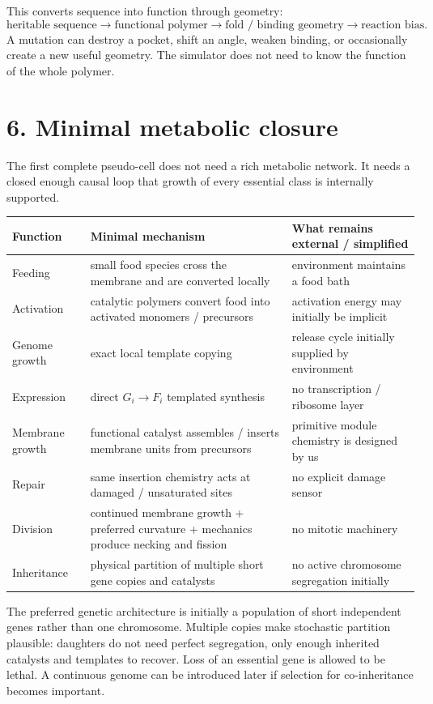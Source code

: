 \documentclass[10pt,a4paper]{article}
\begin{document}
This converts sequence into function through geometry:
\[
\text{heritable sequence} \rightarrow \text{functional polymer} \rightarrow \text{fold / binding geometry} \rightarrow \text{reaction bias}.
\]
A mutation can destroy a pocket, shift an angle, weaken binding, or occasionally create a new useful geometry. The simulator does not need to know the function of the whole polymer.

\section{6. Minimal metabolic closure}

The first complete pseudo-cell does not need a rich metabolic network. It needs a closed enough causal loop that growth of every essential class is internally supported.

\begin{tabularx}{\textwidth}{@{}p{}X X@{}}
\toprule
\textbf{Function} & \textbf{Minimal mechanism} & \textbf{What remains external / simplified} \\
\midrule
Feeding & small food species cross the membrane and are converted locally & environment maintains a food bath \\
Activation & catalytic polymers convert food into activated monomers / precursors & activation energy may initially be implicit \\
Genome growth & exact local template copying & release cycle initially supplied by environment \\
Expression & direct $G_i \rightarrow F_i$ templated synthesis & no transcription / ribosome layer \\
Membrane growth & functional catalyst assembles / inserts membrane units from precursors & primitive module chemistry is designed by us \\
Repair & same insertion chemistry acts at damaged / unsaturated sites & no explicit damage sensor \\
Division & continued membrane growth + preferred curvature + mechanics produce necking and fission & no mitotic machinery \\
Inheritance & physical partition of multiple short gene copies and catalysts & no active chromosome segregation initially \\
\bottomrule
\end{tabularx}

The preferred genetic architecture is initially a population of short independent genes rather than one chromosome. Multiple copies make stochastic partition plausible: daughters do not need perfect segregation, only enough inherited catalysts and templates to recover. Loss of an essential gene is allowed to be lethal. A continuous genome can be introduced later if selection for co-inheritance becomes important.
\end{document}
